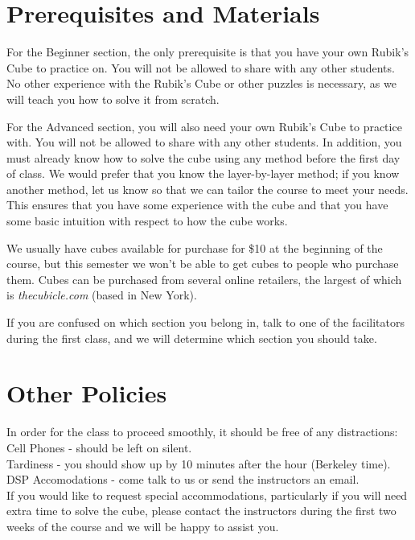 \documentclass[11pt]{article}
\begin{document}
\section*{Prerequisites and Materials}
For the Beginner section, the only prerequisite is that you have your own Rubik’s Cube to practice on. You will not be allowed to share with any other students. No other experience with the Rubik’s Cube or other puzzles is necessary, as we will teach you how to solve it from scratch.

For the Advanced section, you will also need your own Rubik’s Cube to practice with. You will not be allowed to share with any other students. In addition, you must already know how to solve the cube using any method before the first day of class. We would prefer that you know the layer-by-layer method; if you know another method, let us know so that we can tailor the course to meet your needs. This ensures that you have some experience with the cube and that you have some basic intuition with respect to how the cube works.

We usually have cubes available for purchase for \$10 at the beginning of the course, but this semester we won't be able to get cubes to people who purchase them. Cubes can be purchased from several online retailers, the largest of which is \textit{thecubicle.com} (based in New York).

If you are confused on which section you belong in, talk to one of the facilitators during the first class, and we will determine which section you should take.

\section*{Other Policies}
In order for the class to proceed smoothly, it should be free of any distractions: \\
Cell Phones - should be left on silent.\\
Tardiness - you should show up by 10 minutes after the hour (Berkeley time).\\
DSP Accomodations - come talk to us or send the instructors an email.\\
If you would like to request special accommodations, particularly if you will need extra time to solve the cube, please contact the instructors during the first two weeks of the course and we will be happy to assist you.
\end{document}
